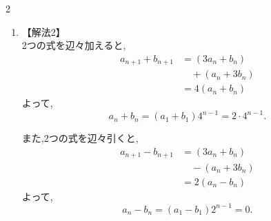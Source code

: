 \documentclass[dvipdfmx,a4paper,11pt,fleqn,openany]{jsbook}
\begin{document}
\begin{multicols*}{2}
\begin{enumerate}[label=(\arabic*),parsep=3pt]
\begin{enumerate}
                    そこで,
                    \[
                      d_n=a_n+b_n
                    \]
                    とおくと,
                    \begin{align*}
                      d_{n+1}
                        &=a_{n+1}+b_{n+1}\\
                        &=(3a_n+b_n)+(a_n+3b_n)\\
                        &=4(a_n+b_n)\\
                        &=4d_n.
                    \end{align*}
                    また,
                    \[
                      d_1=a_1+b_1=2
                    \]
                    であるから,
                    \[
                      d_n=2\cdot4^{n-1}.
                    \]

                    以上より,
                    \[
                    \begin{cases}
                      a_n-b_n=0\\
                      a_n+b_n=2\cdot4^{n-1}
                    \end{cases}
                    \]
                    となる.

                    2式を辺々加えると,
                    \[
                      2a_n=2\cdot4^{n-1}
                    \]
                    であるから,
                    \[
                      a_n=4^{n-1}.
                    \]
                    また,
                    \[
                      b_n=a_n=4^{n-1}.
                    \]
              \item 【解法2】\\
                    2つの式を辺々加えると,
                    \begin{align*}
                      a_{n+1}+b_{n+1}
                        &=(3a_n+b_n)\\
                        &\quad +(a_n+3b_n)\\
                        &=4(a_n+b_n)
                    \end{align*}
                    よって,
                    \[
                      a_n+b_n=(a_1+b_1)4^{n-1}=2\cdot4^{n-1}. \tag*{\(\cdots\) (1)}
                    \]

                    また,2つの式を辺々引くと,
                    \begin{align*}
                      a_{n+1}-b_{n+1}
                        &=(3a_n+b_n)\\
                        &\quad -(a_n+3b_n)\\
                        &=2(a_n-b_n)
                    \end{align*}
                    よって,
                    \[
                      a_n-b_n=(a_1-b_1)2^{n-1}=0. \tag*{\(\cdots\) (2)}
                    \]


\end{enumerate}
\end{enumerate}
\end{multicols*}
\end{document}
